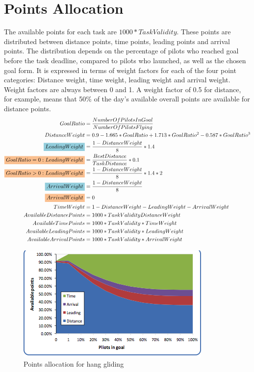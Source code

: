 \documentclass{article}
\begin{document}
\section{Points Allocation}
\label{sec:points-allocation}
The available points for each task are \(1000*TaskValidity\). These points are
distributed between distance points, time points, leading points and arrival
points. The distribution depends on the percentage of pilots who reached goal
before the task deadline, compared to pilots who launched, as well as the
chosen goal form. It is expressed in terms of weight factors for each of the
four point categories: Distance weight, time weight, leading weight and arrival
weight. Weight factors are always between 0 and 1. A weight factor of 0.5 for
distance, for example, means that 50\% of the day’s available overall points
are available for distance points.
\begin{align*}
    GoalRatio &= \frac{NumberOfPilotsInGoal}{NumberOfPilotsFlying} \\
    DistanceWeight &= 0.9 - 1.665 * GoalRatio + 1.713 * GoalRatio^2 - 0.587 * GoalRatio^3 \\
    \hgh{LeadingWeight} &= \frac{1 - DistanceWeight}{8} * 1.4 \\
    \pgh{GoalRatio = 0 : LeadingWeight} &= \frac{BestDistance}{TaskDistance} * 0.1 \\
    \pgh{GoalRatio > 0 : LeadingWeight} &= \frac{1 - DistanceWeight}{8} * 1.4 * 2 \\
    \hgh{ArrivalWeight} &= \frac{1 - DistanceWeight}{8} \\
    \pgh{ArrivalWeight} &= 0 \\
    TimeWeight &= 1 - DistanceWeight - LeadingWeight - ArrivalWeight \\
    AvailableDistancePoints &= 1000 * TaskValidity  DistanceWeight \\
    AvailableTimePoints &= 1000 * TaskValidity * TimeWeight \\
    AvailableLeadingPoints &= 1000 * TaskValidity * LeadingWeight \\
    AvailableArrivalPoints &= 1000 * TaskValidity * ArrivalWeight
\end{align*}

\begin{figure}[h]
    \centering
    \includegraphics[scale=0.8]{img/points-allocation-hg.png}
    \caption{Points allocation for hang gliding}
\end{figure}
\end{document}
